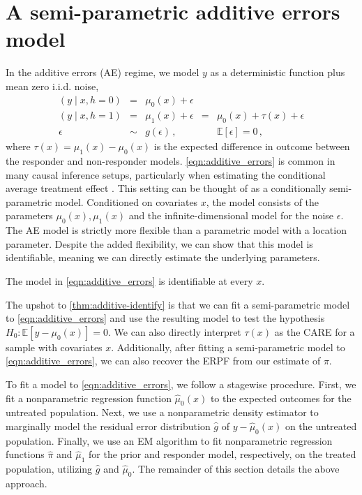 %
\section{A semi-parametric additive errors model}
\label{sec:additive}
In the additive errors (AE) regime, we model $y$ as a deterministic function plus mean zero i.i.d. noise,
\begin{equation}
\label{eqn:additive_errors}
\begin{aligned}
(y \mid x, h=0) &=& \mu_0(x) + \epsilon  & &\\
(y \mid x, h=1) &=& \mu_1(x) + \epsilon &=& \mu_0(x) + \tau(x) + \epsilon\\
\epsilon &\sim& g(\epsilon)\,, && \mathbb{E}[\epsilon] = 0  \, , 
\end{aligned}
\end{equation}
where $\tau(x) = \mu_1(x) - \mu_0(x)$ is the expected difference in outcome between the responder and non-responder models. \cref{eqn:additive_errors} is common in many causal inference setups, particularly when estimating the conditional average treatment effect \citep[cf.][]{hahn:etal:2017:bcf,wager:athey:2018:causal-forests}. This setting can be thought of as a conditionally semi-parametric model. Conditioned on covariates $x$, the model consists of the parameters $\mu_0(x), \mu_1(x)$ and the infinite-dimensional model for the noise $\epsilon$. The AE model is strictly more flexible than a parametric model with a location parameter. Despite the added flexibility, we can show that this model is identifiable, meaning we can directly estimate the underlying parameters.

\begin{theorem}
\label{thm:additive-identify}
The model in \cref{eqn:additive_errors} is identifiable at every $x$.
\end{theorem}

The upshot to \cref{thm:additive-identify} is that we can fit a semi-parametric model to \cref{eqn:additive_errors} and use the resulting model to test the hypothesis $H_0: \mathbb{E}[y - \mu_0(x)] = 0$. 
We can also directly interpret $\tau(x)$ as the CARE for a sample with covariates $x$. 
Additionally, after fitting a semi-parametric model to \cref{eqn:additive_errors}, we can also recover the ERPF from our estimate of $\pi$.


To fit a model to \cref{eqn:additive_errors}, we follow a stagewise procedure. First, we fit a nonparametric regression function $\hat{\mu}_0(x)$ to the expected outcomes for the untreated population. Next, we use a nonparametric density estimator to marginally model the residual error distribution $\hat{g}$ of $y - \hat{\mu}_0(x)$ on the untreated population. Finally, we use an EM algorithm to fit nonparametric regression functions $\hat{\pi}$ and $\hat{\mu}_1$ for the prior and responder model, respectively, on the treated population, utilizing $\hat{g}$ and $\hat{\mu}_0$. The remainder of this section details the above approach.


